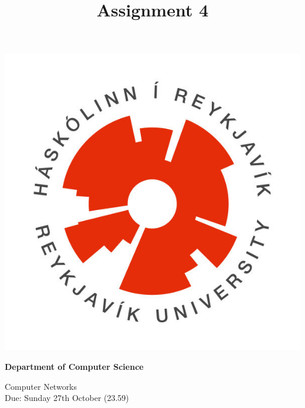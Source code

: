 \documentclass[9pt, addpoints]{exam}
\title{Assignment 4}
\begin{document}
\noindent
\begin{minipage}[l]{.11\textwidth}%
\noindent
    \includegraphics[width=\textwidth]{HR}
\end{minipage}%
\begin{minipage}[r]{.6\textwidth}%
\begin{center}
    {\large\bfseries Department of Computer Science \par
    \large Computer Networks \\[2pt]
    \large Due: Sunday 27th October (23.59)
    }
\end{center}
\end{minipage}%
%
\large     
\vspace{2cm}
\end{document}
